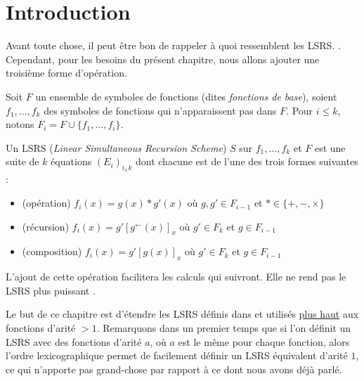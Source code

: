 \documentclass{report}
\newcommand{\eqpred}[3]{#1\left[ #2^{\leftarrow}(#3) \right]_{#3}}
\begin{document}
	\section{Introduction}
	\label{sec:rintroduction}
	
	Avant toute chose, il peut être bon de rappeler à quoi ressemblent les LSRS. \cite{Schwentick1997} \cite{GrandjeanSchwentick2002}. Cependant, pour les besoins du présent chapitre, nous allons ajouter une troisième forme d'opération.
	
	
	\begin{definition}[LSRS]
		\label{def:LSRS_2}
		Soit $F$ un ensemble de symboles de fonctions (dites \emph{fonctions de base}), soient $f_1, \dots, f_k$ des symboles de fonctions qui n'apparaissent pas dans $F$. Pour $i\leqslant k$, notons $F_i = F\cup \{f_1, \dots, f_i\}$. 
	
		Un LSRS (\emph{Linear Simultaneous Recursion Scheme}) $S$ sur $f_1, \dots, f_k$ et $F$ est une suite de $k$ équations $\left(E_i\right)_{i_\in k}$ dont chacune est de l'une des trois formes suivantes :
		
		\begin{itemize}[itemsep=-1mm]
			\item 	(opération) 		$f_i(x) = g(x) * g'(x)$ où $g,g' \in F_{i-1}$ et $* \in \{+, -, \times \}$\footnotemark
			
			
			\item 	(récursion)			$f_i(x) = \eqpred{g'}{g}{x}$ où $g' \in F_k$ et $g \in F_{i-1}$			
			
			\item 	(composition)			$f_i(x) = g'\left[g(x)\right]_x$ où $g' \in F_k$ et $g \in F_{i-1}$
		\end{itemize}
	\end{definition}
	
	\begin{remark}
		L'ajout de cette opération facilitera les calculs qui suivront. Elle ne rend pas le LSRS plus puissant \cite{GrandjeanSchwentick2002}.
	\end{remark}
	
	Le but de ce chapitre est d'étendre les LSRS définis dans \cite{GrandjeanSchwentick2002} et utilisés \hyperref[chap:LSRS]{plus haut} aux fonctions d'arité $>1$. Remarquons dans un premier temps que si l'on définit un LSRS avec des fonctions d'arité $a$, où $a$ est le même pour chaque fonction, alors l'ordre lexicographique permet de facilement définir un LSRS équivalent d'arité $1$, ce qui n'apporte pas grand-chose par rapport à ce dont nous avons déjà parlé.
	
\end{document}
